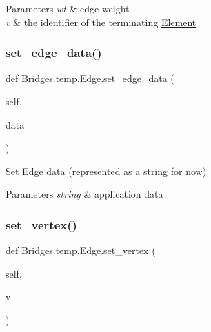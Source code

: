 \begin{DoxyParams}{Parameters}
{\em wt} & edge weight \\
\hline
{\em v} & the identifier of the terminating \mbox{\hyperlink{namespace_bridges_1_1_element}{Element}} \\
\hline
\end{DoxyParams}
\mbox{\label{class_bridges_1_1temp_1_1_edge_a560413418c786163b6222b6268d18a4a}} 
\subsubsection{\texorpdfstring{set\+\_\+edge\+\_\+data()}{set\_edge\_data()}}
{\footnotesize\ttfamily def Bridges.\+temp.\+Edge.\+set\+\_\+edge\+\_\+data (\begin{DoxyParamCaption}\item[{}]{self,  }\item[{}]{data }\end{DoxyParamCaption})}



Set \mbox{\hyperlink{class_bridges_1_1temp_1_1_edge}{Edge}} data (represented as a string for now) 


\begin{DoxyParams}{Parameters}
{\em string} & application data \\
\hline
\end{DoxyParams}
\mbox{\label{class_bridges_1_1temp_1_1_edge_aab4c8151036ff96a35183787761707be}} 
\subsubsection{\texorpdfstring{set\+\_\+vertex()}{set\_vertex()}}
{\footnotesize\ttfamily def Bridges.\+temp.\+Edge.\+set\+\_\+vertex (\begin{DoxyParamCaption}\item[{}]{self,  }\item[{}]{v }\end{DoxyParamCaption})}



